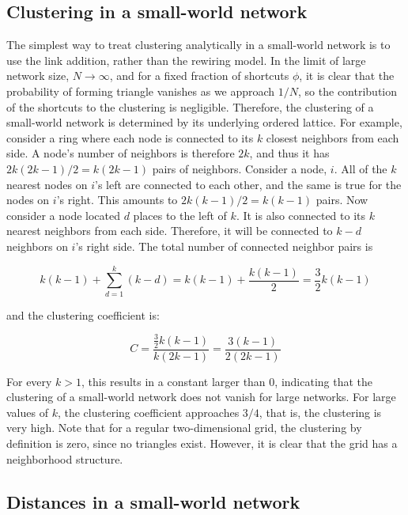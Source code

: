 \subsection{Clustering in a small-world network}

\nd The simplest way to treat clustering analytically in a small-world network is to use the link addition, rather than the rewiring model. In the limit of large network size, $N \to \infty$, and for a fixed fraction of shortcuts $\phi$, it is clear that the probability of forming triangle vanishes as we approach $1/N$, so the contribution of the shortcuts to the clustering is negligible. Therefore, the clustering of a small-world network is determined by its underlying ordered lattice. For example, consider a ring where each node is connected to its $k$ closest neighbors from each side. A node's number of neighbors is therefore $2k$, and thus it has $2k(2k - 1)/2 = k(2k - 1)$ pairs of neighbors. Consider a node, $i$. All of the $k$ nearest nodes on $i$'s left are connected to each other, and the same is true for the nodes on $i$'s right. This amounts to $2k(k - 1)/2 = k(k - 1)$ pairs. Now consider a node located $d$ places to the left of $k$. It is also connected to its $k$ nearest neighbors from each side. Therefore, it will be connected to $k - d$ neighbors on $i$'s right side. The total number of connected neighbor pairs is

\begin{equation}
    k(k-1) + \sum_{d=1}^k (k-d) = k(k-1) + \frac{k(k-1)}{2} = \frac{3}{2} k (k-1)
\end{equation}

\nd and the clustering coefficient is:

\begin{equation}
    C = \frac{\frac{3}{2}k(k-1)}{k(2k-1)} =\frac{3 (k-1)}{2(2k-1)}
\end{equation}

\nd For every $k > 1$, this results in a constant larger than $0$, indicating that the clustering of a small-world network does not vanish for large networks. For large values of $k$, the clustering coefficient approaches $3/4$, that is, the clustering is very high. Note that for a regular two-dimensional grid, the  clustering by definition is zero, since no triangles exist. However, it is clear that the grid has a neighborhood structure.

\subsection{Distances in a small-world network}

